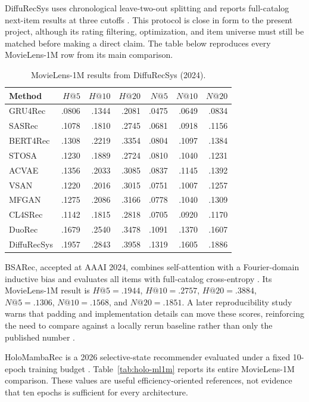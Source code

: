 DiffuRecSys uses chronological leave-two-out splitting and reports full-catalog
next-item results at three cutoffs \cite{DIFFURECSYS}. This protocol is close in
form to the present project, although its rating filtering, optimization, and
item universe must still be matched before making a direct claim. The table
below reproduces every MovieLens-1M row from its main comparison.

\begin{table}[H]
\centering
\caption{MovieLens-1M results from DiffuRecSys (2024).}
\label{tab:diffurecsys-ml1m}
\footnotesize
\begin{tabular}{@{}lrrrrrr@{}}
\toprule
Method & $H@5$ & $H@10$ & $H@20$ & $N@5$ & $N@10$ & $N@20$ \\
\midrule
GRU4Rec & .0806 & .1344 & .2081 & .0475 & .0649 & .0834 \\
SASRec & .1078 & .1810 & .2745 & .0681 & .0918 & .1156 \\
BERT4Rec & .1308 & .2219 & .3354 & .0804 & .1097 & .1384 \\
STOSA & .1230 & .1889 & .2724 & .0810 & .1040 & .1231 \\
ACVAE & .1356 & .2033 & .3085 & .0837 & .1145 & .1392 \\
VSAN & .1220 & .2016 & .3015 & .0751 & .1007 & .1257 \\
MFGAN & .1275 & .2086 & .3166 & .0778 & .1040 & .1309 \\
CL4SRec & .1142 & .1815 & .2818 & .0705 & .0920 & .1170 \\
DuoRec & .1679 & .2540 & .3478 & .1091 & .1370 & .1607 \\
DiffuRecSys & .1957 & .2843 & .3958 & .1319 & .1605 & .1886 \\
\bottomrule
\end{tabular}
\end{table}

BSARec, accepted at AAAI 2024, combines self-attention with a Fourier-domain
inductive bias and evaluates all items with full-catalog cross-entropy
\cite{BSAREC}. Its MovieLens-1M result is $H@5=.1944$, $H@10=.2757$,
$H@20=.3884$, $N@5=.1306$, $N@10=.1568$, and $N@20=.1851$. A later
reproducibility study warns that padding and implementation details can move
these scores, reinforcing the need to compare against a locally rerun baseline
rather than only the published number \cite{BSARECREPRO}.

HoloMambaRec is a 2026 selective-state recommender evaluated under a fixed
10-epoch training budget \cite{HOLOMAMBA}. Table~\ref{tab:holo-ml1m} reports its
entire MovieLens-1M comparison. These values are useful efficiency-oriented
references, not evidence that ten epochs is sufficient for every architecture.

